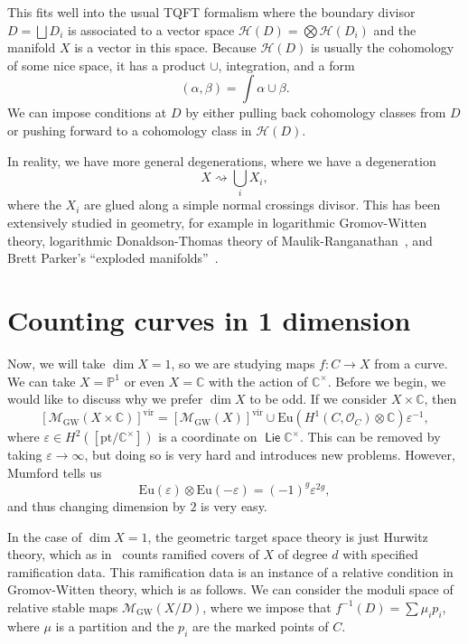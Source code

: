\documentclass[leqno, openany]{memoir}
\theoremstyle{definition}
\theoremstyle{remark}
\theoremstyle{plain}
\theoremstyle{definition}
\theoremstyle{remark}
\newcommand{\C}{\mathbb{C}}
\renewcommand{\P}{\mathbb{P}}
\newcommand{\ep}{\varepsilon}
\newcommand{\mc}[1]{\mathcal{#1}}
\newcommand{\mr}[1]{\mathrm{#1}}
\newcommand{\ms}[1]{\mathsf{#1}}
\newcommand{\on}[1]{\operatorname{#1}}
\begin{document}
This fits well into the usual TQFT formalism where the boundary divisor $D = \bigsqcup D_i$ is associated to a vector space $\mc{H}(D) = \bigotimes \mc{H}(D_i)$ and the manifold $X$ is a vector in this space. Because $\mc{H}(D)$ is usually the cohomology of some nice space, it has a product $\cup$, integration, and a form
\[ (\alpha, \beta) = \int \alpha \cup \beta. \]
We can impose conditions at $D$ by either pulling back cohomology classes from $D$ or pushing forward to a cohomology class in $\mc{H}(D)$.

In reality, we have more general degenerations, where we have a degeneration
\[ X \rightsquigarrow \bigcup_i X_i, \]
where the $X_i$ are glued along a simple normal crossings divisor. This has been extensively studied in geometry, for example in logarithmic Gromov-Witten theory, logarithmic Donaldson-Thomas theory of Maulik-Ranganathan~\cite{logdt}, and Brett Parker's ``exploded manifolds''~\cite{expman}.

\section{Counting curves in 1 dimension}

Now, we will take $\dim X = 1$, so we are studying maps $f \colon C \to X$ from a curve. We can take $X = \P^1$ or even $X = \C$ with the action of $\C^{\times}$. Before we begin, we would like to discuss why we prefer $\dim X$ to be odd. If we consider $X \times \C$, then
\[ [\mc{M}_{\mr{GW}}(X \times \C)]^{\mr{vir}} = [\mc{M}_{\mr{GW}}(X)]^{\mr{vir}} \cup \mr{Eu}(H^1(C, \mc{O}_C) \otimes \C) \ep^{-1}, \] 
where $\ep \in H^2([\mr{pt}/\C^{\times}])$ is a coordinate on $\on{\ms{Lie}} \C^{\times}$. This can be removed by taking $\ep \to \infty$, but doing so is very hard and introduces new problems. However, Mumford tells us
\[ \mr{Eu}(\ep) \otimes \mr{Eu}(-\ep) = (-1)^g \ep^{2g}, \]
and thus changing dimension by $2$ is very easy.

In the case of $\dim X = 1$, the geometric target space theory is just Hurwitz theory, which as in~ counts ramified covers of $X$ of degree $d$ with specified ramification data. This ramification data is an instance of a relative condition in Gromov-Witten theory, which is as follows. We can consider the moduli space of relative stable maps $\mc{M}_{\mr{GW}}(X/D)$, where we impose that $f^{-1}(D) = \sum \mu_i p_i$, where $\mu$ is a partition and the $p_i$ are the marked points of $C$.
\end{document}
